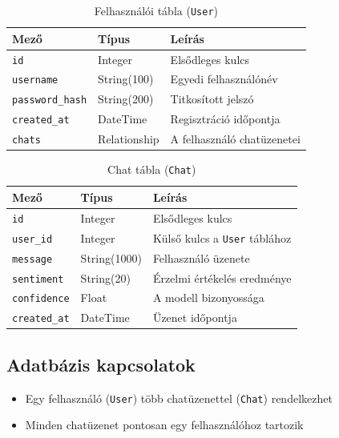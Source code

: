 \documentclass[12pt]{article}
\begin{document}
\begin{table}[h]
\centering
\caption{Felhasználói tábla (\texttt{User})}
\begin{tabularx}{\linewidth}{|l|l|X|}
\hline
\textbf{Mező}           & \textbf{Típus} & \textbf{Leírás} \\ \hline
\texttt{id}             & Integer        & Elsődleges kulcs \\ \hline
\texttt{username}       & String(100)    & Egyedi felhasználónév \\ \hline
\texttt{password\_hash} & String(200)    & Titkosított jelszó \\ \hline
\texttt{created\_at}    & DateTime       & Regisztráció időpontja \\ \hline
\texttt{chats}          & Relationship   & A felhasználó chatüzenetei \\ \hline
\end{tabularx}
\label{tab:user}
\end{table}

\begin{table}[h]
\centering
\caption{Chat tábla (\texttt{Chat})}
\begin{tabularx}{\linewidth}{|l|l|X|}
\hline
\textbf{Mező}        & \textbf{Típus} & \textbf{Leírás} \\ \hline
\texttt{id}          & Integer        & Elsődleges kulcs \\ \hline
\texttt{user\_id}    & Integer        & Külső kulcs a \texttt{User} táblához \\ \hline
\texttt{message}     & String(1000)   & Felhasználó üzenete \\ \hline
\texttt{sentiment}   & String(20)     & Érzelmi értékelés eredménye \\ \hline
\texttt{confidence}  & Float          & A modell bizonyossága \\ \hline
\texttt{created\_at} & DateTime       & Üzenet időpontja \\ \hline
\end{tabularx}
\label{tab:chat}
\end{table}

\subsection{Adatbázis kapcsolatok}

\begin{itemize}
\item Egy felhasználó (\texttt{User}) több chatüzenettel (\texttt{Chat}) rendelkezhet
\item Minden chatüzenet pontosan egy felhasználóhoz tartozik
\end{itemize}
\end{document}
